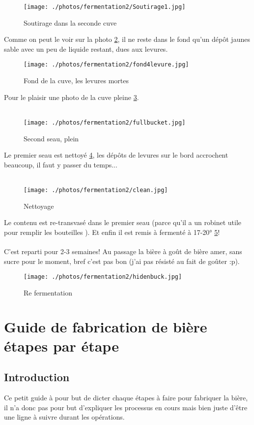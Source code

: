 \documentclass[twoside,twocolumn]{report}
\begin{document}
			\begin{figure}[h!]
				\centering
				\texttt{[image: ./photos/fermentation2/Soutirage1.jpg]}
				\caption{Soutirage dans la seconde cuve}
				\label{soutirage}
			\end{figure}	
			Comme on peut le voir sur la photo \ref{levu}, il ne reste dans le fond qu'un dépôt jaunes sable avec un peu de liquide restant, dues aux levures.
			\begin{figure}[h!]
				\centering
				\texttt{[image: ./photos/fermentation2/fond4levure.jpg]}
				\caption{Fond de la cuve, les levures mortes}
				\label{levu}
			\end{figure}
			Pour le plaisir une photo de la cuve pleine \ref{full}.\\ \\
			\begin{figure}[h!]
				\centering
				\texttt{[image: ./photos/fermentation2/fullbucket.jpg]}
				\caption{Second seau, plein}
				\label{full}
			\end{figure}
			Le premier seau est nettoyé \ref{clean}, les dépôts de levures sur le bord accrochent beaucoup, il faut y passer du temps...\\ \\
			\begin{figure}[h!]
				\centering
				\texttt{[image: ./photos/fermentation2/clean.jpg]}
				\caption{Nettoyage}
				\label{clean}
			\end{figure} 
			Le contenu est re-transvasé dans le premier seau (parce qu'il a un robinet utile pour remplir les bouteilles ). Et enfin il est remis à fermenté à 17-20° \ref{hidden}!\\ \\
			C'est reparti pour 2-3 semaines! Au passage la bière à goût de bière amer, sans sucre pour le moment, bref c'est pas bon (j'ai pas résisté au fait de goûter :p).
			\begin{figure}[h!]
				\centering
				\texttt{[image: ./photos/fermentation2/hidenbuck.jpg]}
				\caption{Re fermentation}
				\label{hidden}
			\end{figure} 
				 
				 
				 
		\chapter*{Guide de fabrication de bière étapes par étape}
		\section{Introduction}
		Ce petit guide à pour but de dicter chaque étapes à faire pour fabriquer la bière, il n'a donc pas pour but d'expliquer les processus en cours mais bien juste d'être une ligne à suivre durant les opérations.
		
\end{document}

